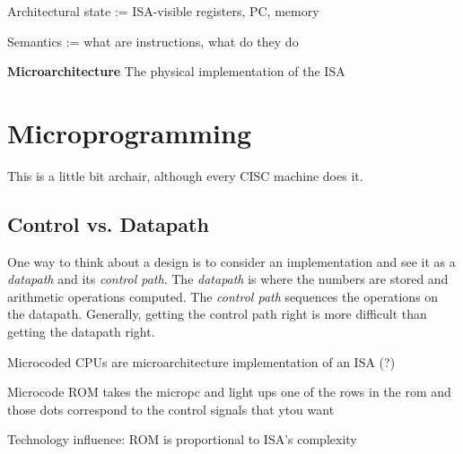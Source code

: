 \noindent Architectural state := ISA-visible registers, PC, memory

\noindent Semantics := what are instructions, what do they do

\noindent \textbf{Microarchitecture} The physical implementation of the ISA


\section{Microprogramming}
This is a little bit archair, although every CISC machine does it.

\subsection{Control vs. Datapath}
One way to think about a design is to consider an implementation and see it as a \textit{datapath} and its \textit{control path}.
The \textit{datapath} is where the numbers are stored and arithmetic operations computed.
The \textit{control path} sequences the operations on the datapath.
Generally, getting the control path right is more difficult than getting the datapath right.

Microcoded CPUs are microarchitecture implementation of an ISA (?)

Microcode ROM takes the micropc and light ups one of the rows in the rom and those dots correspond to the control signals that ytou want

Technology influence: ROM is proportional to ISA's complexity

